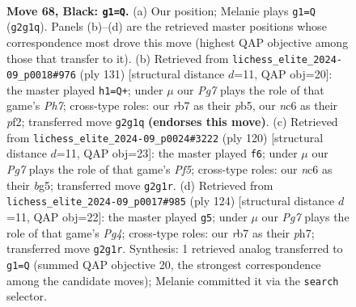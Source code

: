 \documentclass[11pt]{article}
\begin{document}
\clearpage

\begin{figure}[p]\centering
\begin{subfigure}{0.46\textwidth}\centering
\resizebox{\linewidth}{!}{%
\newchessgame
\chessboard[
  setfen={8/1R6/2Np4/8/5k2/5n1K/6p1/8 b - - 0 68},
  showmover=false,
  pgfstyle=straightmove, color=movearrow, markmove={g2-g1}
]}
\caption{}
\end{subfigure}\hfill
\begin{subfigure}{0.46\textwidth}\centering
\resizebox{\linewidth}{!}{%
\newchessgame
\chessboard[
  setfen={8/8/3k4/1Pn5/5p2/7K/5P1p/8 b - - 0 66},
  showmover=false,
  pgfstyle=straightmove, color=movearrow, markmove={h2-h1}
]}
\caption{}
\end{subfigure}
\\[4pt]
\begin{subfigure}{0.46\textwidth}\centering
\resizebox{\linewidth}{!}{%
\newchessgame
\chessboard[
  setfen={8/8/8/5Pb1/4k1N1/6K1/8/8 w - - 3 61},
  showmover=false,
  pgfstyle=straightmove, color=movearrow, markmove={f5-f6}
]}
\caption{}
\end{subfigure}\hfill
\begin{subfigure}{0.46\textwidth}\centering
\resizebox{\linewidth}{!}{%
\newchessgame
\chessboard[
  setfen={8/7p/8/8/4NKP1/7k/8/8 w - - 1 63},
  showmover=false,
  pgfstyle=straightmove, color=movearrow, markmove={g4-g5}
]}
\caption{}
\end{subfigure}
\caption{\textbf{Move 68, Black: \texttt{g1=Q}.} (a) Our position; Melanie plays \texttt{g1=Q} (\texttt{g2g1q}). Panels (b)--(d) are the retrieved master positions whose correspondence most drove this move (highest QAP objective among those that transfer to it). (b) Retrieved from \texttt{lichess\_elite\_2024-09\_p0018\#976} (ply 131) [structural distance $d$=11, QAP obj=20]: the master played \texttt{h1=Q+}; under $\mu$ our \emph{Pg7} plays the role of that game's \emph{Ph7}; cross-type roles: our \emph{r}b7 as their \emph{p}b5, our \emph{n}c6 as their \emph{p}f2; transferred move \texttt{g2g1q} \textbf{(endorses this move)}. (c) Retrieved from \texttt{lichess\_elite\_2024-09\_p0024\#3222} (ply 120) [structural distance $d$=11, QAP obj=23]: the master played \texttt{f6}; under $\mu$ our \emph{Pg7} plays the role of that game's \emph{Pf5}; cross-type roles: our \emph{n}c6 as their \emph{b}g5; transferred move \texttt{g2g1r}. (d) Retrieved from \texttt{lichess\_elite\_2024-09\_p0017\#985} (ply 124) [structural distance $d$=11, QAP obj=22]: the master played \texttt{g5}; under $\mu$ our \emph{Pg7} plays the role of that game's \emph{Pg4}; cross-type roles: our \emph{r}b7 as their \emph{p}h7; transferred move \texttt{g2g1r}. Synthesis: 1 retrieved analog transferred to \texttt{g1=Q} (summed QAP objective 20, the strongest correspondence among the candidate moves); Melanie committed it via the \texttt{search} selector.}
\label{fig:thought-m135}
\end{figure}
\end{document}
